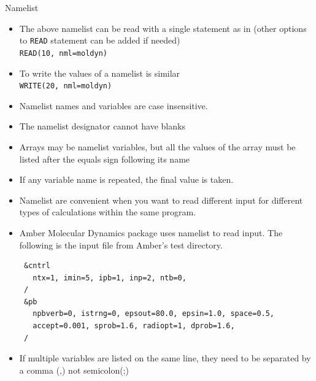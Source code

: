 \documentclass[c,mathserif,compress,xcolor=svgnames]{beamer}
\newcommand{\lstfortran}[1]{\lstinline[language={[90]Fortran},basicstyle=\footnotesize\ttfamily]|#1|}
\begin{document}
\begin{frame}{Namelist}
\begin{itemize}
\begin{itemize}
      \end{itemize}
    \item The above namelist can be read with a single statement as in (other options to \lstfortran{READ} statement can be added if needed)\\
      \lstfortran{READ(10, nml=moldyn)}
    \item To write the values of a namelist is similar\\
      \lstfortran{WRITE(20, nml=moldyn)}
    \item Namelist names and variables are case insensitive.
    \item The namelist designator cannot have blanks
    \item Arrays may be namelist variables, but all the values of the array must be listed after the equals sign following its name
    \item If any variable name is repeated, the final value is taken.
    \item Namelist are convenient when you want to read different input for different types of calculations within the same program.
    \item Amber Molecular Dynamics package uses namelist to read input. The following is the input file from Amber's test directory.
      \begin{lstlisting}
 &cntrl 
   ntx=1, imin=5, ipb=1, inp=2, ntb=0,  
 /      
 &pb
   npbverb=0, istrng=0, epsout=80.0, epsin=1.0, space=0.5,  
   accept=0.001, sprob=1.6, radiopt=1, dprob=1.6,   
 /      
      \end{lstlisting}
    \item If multiple variables are listed on the same line, they need to be separated by a comma (,) not semicolon(;)
  \end{itemize}
\end{frame}
\end{document}
